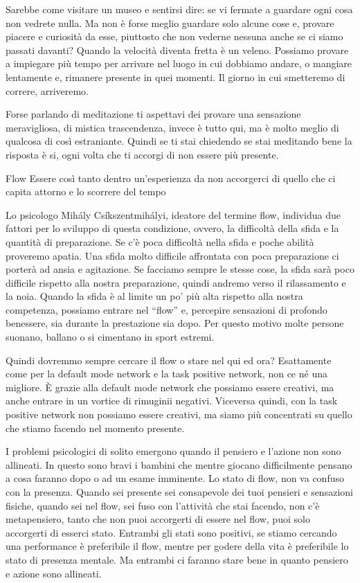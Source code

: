 \documentclass[12pt]{book} %
\begin{document}
Sarebbe come visitare un museo e sentirsi dire: se vi fermate a guardare ogni cosa non vedrete nulla. Ma non è forse
meglio guardare solo alcune cose e, provare piacere e curiosità da esse, piuttosto che non vederne nessuna anche se ci
siamo passati davanti? Quando la velocità diventa fretta è un veleno. Possiamo provare a impiegare più tempo per
arrivare nel luogo in cui dobbiamo andare, o mangiare lentamente e, rimanere presente in quei momenti. Il giorno in cui
smetteremo di correre, arriveremo.

Forse parlando di meditazione ti aspettavi dei provare una sensazione meravigliosa, di mistica trascendenza, invece è
tutto qui, ma è molto meglio di qualcosa di così estraniante. Quindi se ti stai chiedendo se stai meditando bene la
risposta è si, ogni volta che ti accorgi di non essere più presente.

\begin{mdframed}[linewidth=1pt]
Flow
Essere così tanto dentro un'esperienza da non accorgerci di quello che ci capita attorno e lo scorrere del tempo

Lo psicologo Mihály Csíkszentmihályi, ideatore del termine flow, individua due fattori per lo sviluppo di questa
condizione, ovvero, la difficoltà della sfida e la quantità di preparazione. Se c'è poca
difficoltà nella sfida e poche abilità proveremo apatia. Una sfida molto difficile affrontata con poca preparazione ci
porterà ad ansia e agitazione. Se facciamo sempre le stesse cose, la sfida sarà poco difficile rispetto alla nostra
preparazione, quindi andremo verso il rilassamento e la noia. Quando la sfida è al limite un po'
più alta rispetto alla nostra competenza, possiamo entrare nel “flow” e, percepire sensazioni di profondo benessere,
sia durante la prestazione sia dopo. Per questo motivo molte persone suonano, ballano o si cimentano in sport estremi.

Quindi dovremmo sempre cercare il flow o stare nel qui ed ora? 
Esattamente come per la default mode network e la task positive network, non ce né una
migliore. È grazie alla default mode network che possiamo essere creativi, ma anche entrare in un vortice di rimuginii
negativi. Viceversa quindi, con la task positive network non possiamo essere creativi, ma siamo più concentrati su
quello che stiamo facendo nel momento presente.

I problemi psicologici di solito emergono quando il pensiero e l'azione non sono allineati. In questo sono bravi i bambini che mentre giocano difficilmente pensano a cosa faranno dopo o ad un esame imminente. Lo stato di flow, non va confuso con la presenza. Quando sei presente sei consapevole dei tuoi pensieri e sensazioni fisiche, quando sei nel flow, sei fuso con l'attività che stai facendo, non c'è metapensiero, tanto che non puoi accorgerti di essere nel flow, puoi solo accorgerti di esserci stato. Entrambi gli stati sono positivi, se stiamo cercando una performance è preferibile il flow, mentre per godere della vita è preferibile lo stato di presenza mentale. Ma entrambi ci faranno stare bene in quanto pensiero e azione sono allineati.
\end{mdframed}
\end{document}
